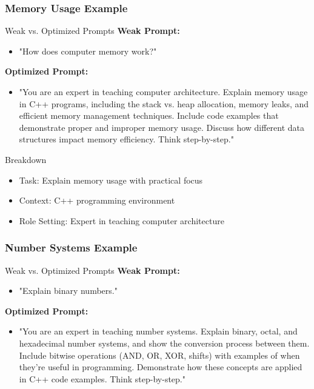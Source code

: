 \documentclass{beamer}
\begin{document}
\begin{frame}
\frametitle{Memory Usage Example}
\begin{block}{Weak vs. Optimized Prompts}
\textbf{Weak Prompt:}
\begin{itemize}
\item "How does computer memory work?"
\end{itemize}

\textbf{Optimized Prompt:}
\begin{itemize}
\item "You are an expert in teaching computer architecture. Explain memory usage in C++ programs, including the stack vs. heap allocation, memory leaks, and efficient memory management techniques. Include code examples that demonstrate proper and improper memory usage. Discuss how different data structures impact memory efficiency. Think step-by-step."
\end{itemize}
\end{block}

\begin{alertblock}{Breakdown}
\begin{itemize}
\item Task: Explain memory usage with practical focus
\item Context: C++ programming environment
\item Role Setting: Expert in teaching computer architecture
\end{itemize}
\end{alertblock}
\end{frame}

\begin{frame}
\frametitle{Number Systems Example}
\begin{block}{Weak vs. Optimized Prompts}
\textbf{Weak Prompt:}
\begin{itemize}
\item "Explain binary numbers."
\end{itemize}

\textbf{Optimized Prompt:}
\begin{itemize}
\item "You are an expert in teaching number systems. Explain binary, octal, and hexadecimal number systems, and show the conversion process between them. Include bitwise operations (AND, OR, XOR, shifts) with examples of when they're useful in programming. Demonstrate how these concepts are applied in C++ code examples. Think step-by-step."
\end{itemize}
\end{block}
\end{frame}
\end{document}
